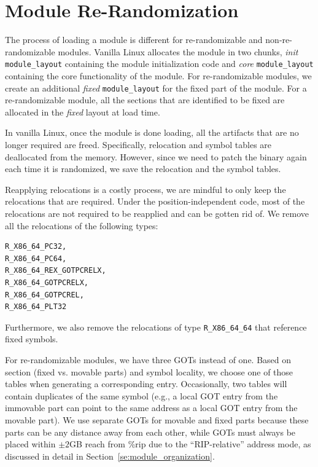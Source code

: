 \section{Module Re-Randomization}
\label{se:module_randomization}
The process of loading a module is different for re-randomizable and non-re-randomizable modules. Vanilla Linux allocates the module in two chunks, \textit{init} \verb|module_layout| containing the module initialization code and \textit{core} \verb|module_layout| containing the core functionality of the module. For re-randomizable modules, we create an additional \textit{fixed} \verb|module_layout| for the fixed part of the module. For a re-randomizable module, all the sections that are identified to be fixed are allocated in the \textit{fixed} layout at load time.

In vanilla Linux, once the module is done loading, all the artifacts that are no longer required are freed. Specifically, relocation and symbol tables are deallocated from the memory. However, since we need to patch the binary again each time it is randomized, we save the relocation and the symbol tables.

Reapplying relocations is a costly process, we are mindful to only keep the relocations that are required. Under the position-independent code, most of the relocations are not required to be reapplied and can be gotten rid of. We remove all the relocations of the following types:
\begin{verbatim}
R_X86_64_PC32,
R_X86_64_PC64,
R_X86_64_REX_GOTPCRELX,
R_X86_64_GOTPCRELX,
R_X86_64_GOTPCREL,
R_X86_64_PLT32
\end{verbatim}
Furthermore, we also remove the relocations of type \verb|R_X86_64_64| that reference fixed symbols.

For re-randomizable modules, we have three GOTs instead of one. Based on section (fixed vs. movable parts) and symbol locality, we choose one of those tables when generating a corresponding entry. Occasionally, two tables will contain duplicates of the same symbol (e.g., a local GOT entry
from the immovable part can point to the same address as a local GOT entry from the movable part). We use separate GOTs for movable and fixed parts because these parts can be any distance away from each other, while GOTs must always be placed within $\pm 2$GB reach from \%rip due to the ``RIP-relative'' address mode, as discussed in detail in Section~\ref{se:module_organization}.

